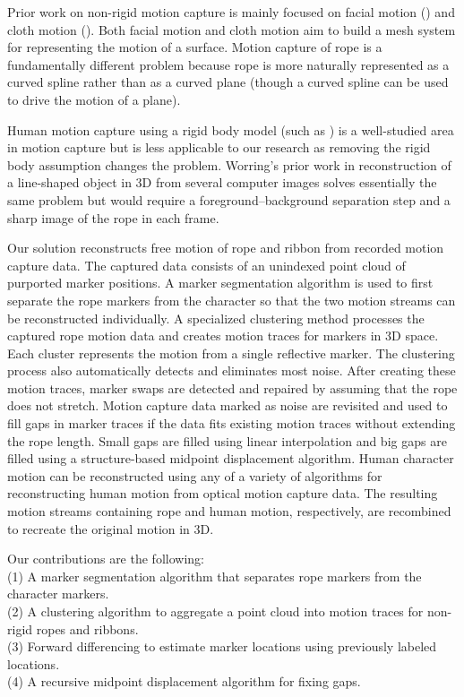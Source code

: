 Prior work on non-rigid motion capture is mainly focused on facial motion (\cite{Lorenzo03,SifakisEftychios2005}) and cloth motion (\cite{MarcusVolker04clothmotion,whiteRyan2007siggraph,PritchardDavid2003,Bhat2003}). Both facial motion and cloth motion aim to build a mesh system for representing the motion of a surface. Motion capture of rope is a fundamentally different problem because rope is more naturally represented as a curved spline rather than as a curved plane (though a curved spline can be used to drive the motion of a plane). 

Human motion capture using a rigid body model (such as \cite{Lou:EHM2010,Wen:2006:MCD,Rajko:2007:RAK,ZordanVictorBrian2003}) is a well-studied area in motion capture but is less applicable to our research as removing the rigid body assumption changes the problem. Worring's \cite{WorringMarcel94measurementof} prior work in reconstruction of a line-shaped object in 3D from several computer images solves essentially the same problem but would require a foreground--background separation step and a sharp image of the rope in each frame.  
 
Our solution reconstructs free motion of rope and ribbon from recorded motion capture data. The captured data consists of an unindexed point cloud of purported marker positions. A marker segmentation algorithm is used to first separate the rope markers from the character so that the two motion streams can be reconstructed individually. A specialized clustering method processes the captured rope motion data and creates motion traces for markers in 3D space. Each cluster represents the motion from a single reflective marker. The clustering process also automatically detects and eliminates most noise. After creating these motion traces, marker swaps are detected and repaired by assuming that the rope does not stretch. Motion capture data marked as noise are revisited and used to fill gaps in marker traces if the data fits existing motion traces without extending the rope length. Small gaps are filled using linear interpolation and big gaps are filled using a structure-based midpoint displacement algorithm. Human character motion can be reconstructed using any of a variety of algorithms for reconstructing human motion from optical motion capture data.  The resulting motion streams containing rope and human motion, respectively, are recombined to recreate the original motion in 3D.

Our contributions are the following: \\
\indent (1) A marker segmentation algorithm that separates rope markers from the character markers.\\
\indent (2) A clustering algorithm to aggregate a point cloud into motion traces for non-rigid ropes and ribbons. \\
\indent (3) Forward differencing to estimate marker locations using previously labeled locations. \\
\indent	(4) A recursive midpoint displacement algorithm for fixing gaps.

